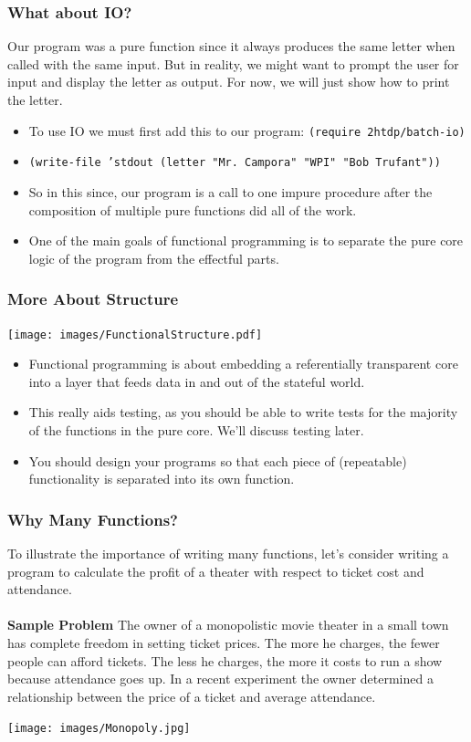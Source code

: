 \documentclass{beamer}
\begin{document}
\begin{frame}
  \frametitle{What about IO?}
  Our program was a pure function since it always produces the same letter
  when called with the same input. But in reality, we might want to prompt
  the user for input and display the letter as output. For now, we will just show
  how to print the letter.
  \begin{itemize}
  \item<2-> To use IO we must first add this to our program:
    \texttt{(require 2htdp/batch-io)}
  \item<3-> \texttt{(write-file 'stdout (letter "Mr. Campora" "WPI" "Bob Trufant"))}
  \item<4-> So in this since, our program is a call to one impure procedure after
    the composition of multiple pure functions did all of the work.
  \item<5-> One of the main goals of functional programming is to separate the
    pure core logic of the program from the effectful parts.    
  \end{itemize}
\end{frame}

\begin{frame}
  \frametitle{More About Structure}
  \begin{center}
    \texttt{[image: images/FunctionalStructure.pdf]}
  \end{center}
  \begin{itemize}
  \item<2-> Functional programming is about embedding a referentially transparent
    core into a layer that feeds data in and out of the stateful world.
  \item<3-> This really aids testing, as you should be able to write tests for
    the majority of the functions in the pure core. We'll discuss testing later.
  \item<4-> You should design your programs so that each piece of
    (repeatable) functionality is separated into its own function.
  \end{itemize}
\end{frame}

\begin{frame}
  \frametitle{Why Many Functions?}
  To illustrate the importance of writing many functions, let's consider
  writing a program to calculate the profit of a theater with respect to
  ticket cost and attendance.
  \pause
  \\ \\
  \textbf{Sample Problem} The owner of a monopolistic movie theater in a small town has complete freedom in setting ticket prices. The more he charges, the fewer people can afford tickets. The less he charges, the more it costs to run a show because attendance goes up. In a recent experiment the owner determined a relationship between the price of a ticket and average attendance.
  \pause
  \begin{center}
    \texttt{[image: images/Monopoly.jpg]}
  \end{center}
\end{frame}
\end{document}
